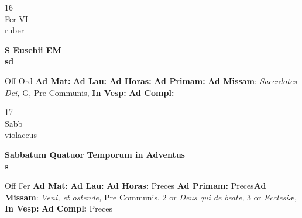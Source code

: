 \documentclass[10pt, openany]{book}
\begin{document}
        \begin{center}
            \begin{minipage}{3.5in}
                \vspace{2em}
                \begin{minipage}{0.5in}
                    {\Huge 16} \\
                    {\normalsize Fer VI} \\
                    {\normalsize ruber}
                \end{minipage}
                \begin{minipage}{3.0in}
                    \textbf{ \large S Eusebii EM \\
                    \textnormal{\normalsize sd}} \\ 
                \end{minipage}
                \begin{justify}Off Ord
                    \textbf{Ad Mat: }
                    \textbf{Ad Lau: }
                    \textbf{Ad Horas: }
                    \textbf{Ad Primam: }\textbf{Ad Missam}: \textit{Sacerdotes Dei,} G, Pre Communis,  
                    \textbf{In Vesp: }
                    \textbf{Ad Compl: }
                \end{justify}
            \end{minipage}
        \end{center}
    
        \begin{center}
            \begin{minipage}{3.5in}
                \vspace{2em}
                \begin{minipage}{0.5in}
                    {\Huge 17} \\
                    {\normalsize Sabb} \\
                    {\normalsize violaceus}
                \end{minipage}
                \begin{minipage}{3.0in}
                    \textbf{ \large Sabbatum Quatuor Temporum in Adventus \\
                    \textnormal{\normalsize s}} \\ 
                \end{minipage}
                \begin{justify}Off Fer
                    \textbf{Ad Mat: }
                    \textbf{Ad Lau: }
                    \textbf{Ad Horas: }Preces
                    \textbf{Ad Primam: }Preces\textbf{Ad Missam}: \textit{Veni, et ostende,} Pre Communis, 2 or \textit{Deus qui de beate,} 3 or \textit{Ecclesiæ,}  
                    \textbf{In Vesp: }
                    \textbf{Ad Compl: }Preces
                \end{justify}
            \end{minipage}
        \end{center}
    
\end{document}
